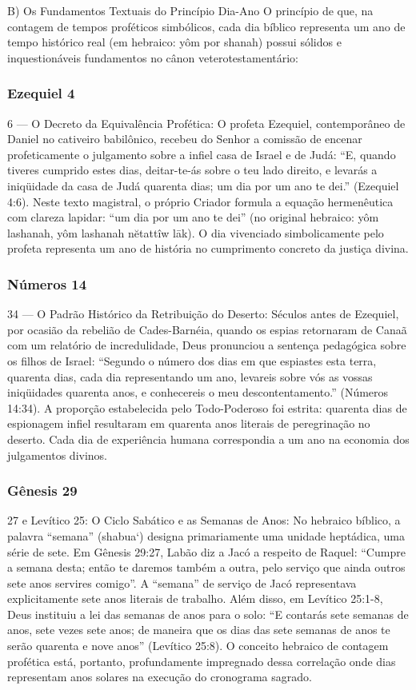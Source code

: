 B) Os Fundamentos Textuais do Princípio Dia-Ano
O princípio de que, na contagem de tempos proféticos simbólicos, cada dia bíblico representa um ano de tempo histórico real (em hebraico: yôm por shanah) possui sólidos e inquestionáveis fundamentos no cânon veterotestamentário:


\subsubsection*{Ezequiel 4}
6 — O Decreto da Equivalência Profética:
O profeta Ezequiel, contemporâneo de Daniel no cativeiro babilônico, recebeu do Senhor a comissão de encenar profeticamente o julgamento sobre a infiel casa de Israel e de Judá:
``E, quando tiveres cumprido estes dias, deitar-te-ás sobre o teu lado direito, e levarás a iniqüidade da casa de Judá quarenta dias; um dia por um ano te dei.'' (Ezequiel 4:6).
Neste texto magistral, o próprio Criador formula a equação hermenêutica com clareza lapidar: ``um dia por um ano te dei'' (no original hebraico: yôm lashanah, yôm lashanah nĕtattîw lāk). O dia vivenciado simbolicamente pelo profeta representa um ano de história no cumprimento concreto da justiça divina.


\subsubsection*{Números 14}
34 — O Padrão Histórico da Retribuição do Deserto:
Séculos antes de Ezequiel, por ocasião da rebelião de Cades-Barnéia, quando os espias retornaram de Canaã com um relatório de incredulidade, Deus pronunciou a sentença pedagógica sobre os filhos de Israel:
``Segundo o número dos dias em que espiastes esta terra, quarenta dias, cada dia representando um ano, levareis sobre vós as vossas iniqüidades quarenta anos, e conhecereis o meu descontentamento.'' (Números 14:34).
A proporção estabelecida pelo Todo-Poderoso foi estrita: quarenta dias de espionagem infiel resultaram em quarenta anos literais de peregrinação no deserto. Cada dia de experiência humana correspondia a um ano na economia dos julgamentos divinos.


\subsubsection*{Gênesis 29}
27 e Levítico 25: O Ciclo Sabático e as Semanas de Anos:
No hebraico bíblico, a palavra ``semana'' (shabua‘) designa primariamente uma unidade heptádica, uma série de sete. Em Gênesis 29:27, Labão diz a Jacó a respeito de Raquel: ``Cumpre a semana desta; então te daremos também a outra, pelo serviço que ainda outros sete anos servires comigo''. A ``semana'' de serviço de Jacó representava explicitamente sete anos literais de trabalho.
Além disso, em Levítico 25:1-8, Deus instituiu a lei das semanas de anos para o solo: ``E contarás sete semanas de anos, sete vezes sete anos; de maneira que os dias das sete semanas de anos te serão quarenta e nove anos'' (Levítico 25:8). O conceito hebraico de contagem profética está, portanto, profundamente impregnado dessa correlação onde dias representam anos solares na execução do cronograma sagrado.

